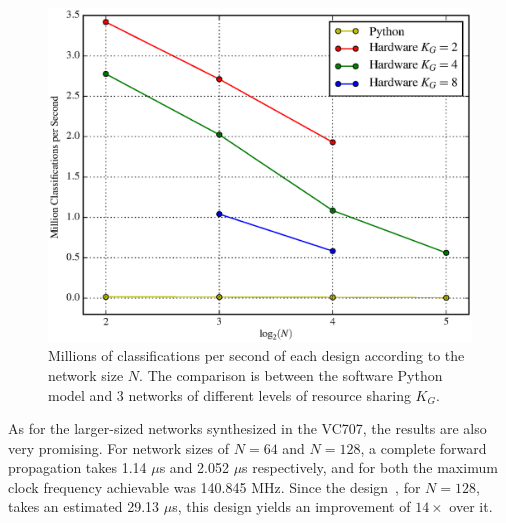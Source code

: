 \begin{figure}
    \centering
    \includegraphics[width=\linewidth]{figures/Mclass-psec.eps}
    \caption[Millions of classifications per second of each design according to the network size $N$]{Millions of classifications per second of each design according to the network size $N$. The comparison is between the software Python model and 3 networks of different levels of resource sharing $K_G$.}
    \label{fig:Mclass-psec}
\end{figure}

As for the larger-sized networks synthesized in the VC707, the results are also very promising. For network sizes of $N=64$ and $N=128$, a complete
forward propagation takes 1.14 $\mu$s and 2.052 $\mu$s respectively, and for both the maximum clock frequency achievable was 140.845 MHz. Since the
design~\cite{Chang15}, for $N=128$, takes an estimated 29.13 $\mu$s, this design yields an improvement of $14\times$ over it.
